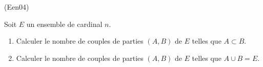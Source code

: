 \begin{tiny}(Een04)\end{tiny} Soit $E$ un ensemble de cardinal $n$.
\begin{enumerate}
  \item Calculer le nombre de couples de parties $(A,B)$ de $E$ telles que $A\subset B$.
  \item Calculer le nombre de couples de parties $(A,B)$ de $E$ telles que $A\cup B = E$.
\end{enumerate}
